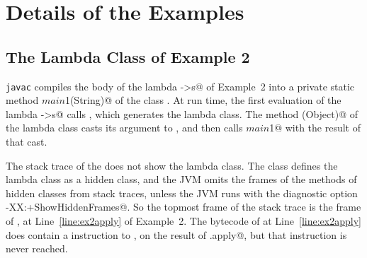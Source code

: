 \section{Details of the Examples}
\label{app:examples}

\subsection{The Lambda Class of Example 2}
\label{app:lambda}
\texttt{javac} compiles the body of the lambda \Q@s->s@ of Example~2 into a private static method \Q@lambda$main$1(String)@ of the class \Q@Broken@.
At run time, the first evaluation of the lambda \Q@s->s@ calls \Q@LambdaMetafactory@, which generates the lambda class.
The method \Q@apply(Object)@ of the lambda class casts its argument to \Q@String@, and then calls \Q@lambda$main$1@ with the result of that cast.

\begin{sloppypar}
The stack trace of the \Q@ClassCastException@ does not show the lambda class.
The class \Q@LambdaMetafactory@ defines the lambda class as a hidden class, and the JVM omits the frames of the methods of hidden classes from stack traces, unless the JVM runs with the diagnostic option \Q@-XX:+ShowHiddenFrames@.
So the topmost frame of the stack trace is the frame of \Q@m@, at Line~\ref{line:ex2apply} of Example~2.
The bytecode of \Q@m@ at Line~\ref{line:ex2apply} does contain a \Q@checkcast@ instruction to \Q@String@, on the result of \Q@f.apply@, but that instruction is never reached.
\end{sloppypar}
